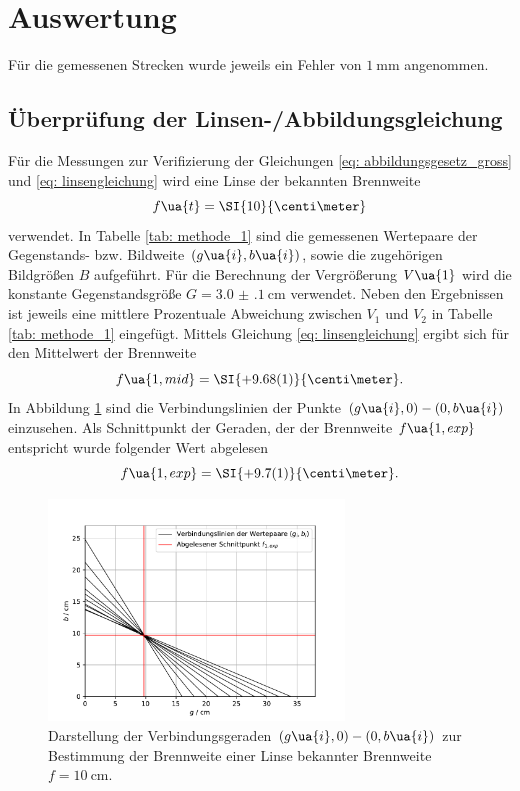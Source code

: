 \section{Auswertung}
Für die gemessenen Strecken wurde jeweils ein Fehler von $\SI{1}{\milli\meter}$ angenommen.

\subsection{Überprüfung der Linsen-/Abbildungsgleichung}
Für die Messungen zur Verifizierung der Gleichungen \eqref{eq: abbildungsgesetz_gross} und \eqref{eq: linsengleichung} wird eine Linse
der bekannten Brennweite
\begin{equation}
  f\ua{t} = \SI{10}{\centi\meter}
\end{equation}
verwendet. In Tabelle \ref{tab: methode_1} sind die gemessenen Wertepaare der Gegenstands- bzw. Bildweite $(g\ua{i}, b\ua{i})$,
sowie die zugehörigen Bildgrößen $B$ aufgeführt. Für die Berechnung der Vergrößerung $V\ua{1}$
wird die konstante Gegenstandsgröße $G = \SI{3.0(1)}{\centi\meter}$ verwendet. Neben den Ergebnissen ist jeweils
eine mittlere Prozentuale Abweichung zwischen $V_1$ und $V_2$ in Tabelle \ref{tab: methode_1} eingefügt.
Mittels Gleichung \eqref{eq: linsengleichung} ergibt sich für den Mittelwert der Brennweite
\begin{equation}
  f\ua{1, mid} = \SI{+9.68(1)}{\centi\meter}.
\end{equation}
In Abbildung \ref{fig: methode_1} sind die Verbindungslinien der Punkte $(g\ua{i}, 0)-(0, b\ua{i})$ einzusehen. Als Schnittpunkt
der Geraden, der der Brennweite $f\ua{1, exp}$ entspricht wurde folgender Wert abgelesen
\begin{equation}
  f\ua{1, exp} = \SI{+9.7(1)}{\centi\meter}.
\end{equation}
\begin{figure}
  \centering
  \includegraphics[width=0.7\textwidth]{../Messdaten/plots/methode_1.pdf}
  \caption{Darstellung der Verbindungsgeraden $(g\ua{i}, 0) - (0, b\ua{i})$ zur Bestimmung der Brennweite einer
  Linse bekannter Brennweite $f = \SI{10}{\centi\meter}$.}
  \label{fig: methode_1}
\end{figure}


